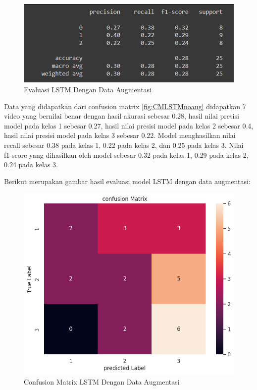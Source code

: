 \begin{figure} [H] \centering
  \includegraphics[scale=0.85]{gambar/scoreLSTMnoaug.png}
  \caption{Evaluasi LSTM Dengan Data Augmentasi}
  \label{fig:ScoreLSTMnoaug}
\end{figure}
Data yang didapatkan dari confusion matrix \ref{fig:CMLSTMnoaug} didapatkan 7 video yang bernilai benar
dengan hasil akurasi sebesar 0.28, hasil nilai presisi model pada kelas 1 sebesar 0.27, hasil nilai
presisi model pada kelas 2 sebesar 0.4, hasil nilai presisi model pada kelas 3 sebesar 0.22. Model menghasilkan
nilai recall sebesar 0.38 pada kelas 1, 0.22 pada kelas 2, dan 0.25 pada kelas 3. Nilai f1-score yang dihasilkan
oleh model sebesar 0.32 pada kelas 1, 0.29 pada kelas 2, 0.24 pada kelas 3.

Berikut merupakan gambar hasil evaluasi model LSTM dengan data augmentasi:
\begin{figure} [H] \centering
  \includegraphics[scale=0.45]{gambar/CMLSTMaug.png}
  \caption{Confusion Matrix LSTM Dengan Data Augmentasi}
  \label{fig:CMLSTMaug}
\end{figure}

